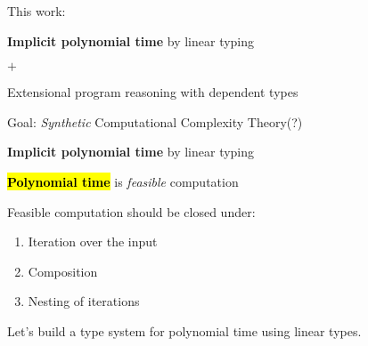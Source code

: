 \documentclass[xetex,aspectratio=169,14pt,hyperref={pdfpagelabels=true,pdflang={en-GB}}]{beamer}
\newcommand{\heading}[1]{\textcolor{TitleRed}{#1}}
\begin{document}
\begin{frame}
  \heading{This work:}

  \bigskip

  \begin{center}
    {\bf Implicit polynomial time} by linear typing

    $+$

    Extensional program reasoning with dependent types
  \end{center}

  \bigskip
  \pause

  \begin{center}
    Goal: {\it Synthetic} Computational Complexity Theory\pause(?)
  \end{center}
\end{frame}

\begin{frame}
  \begin{center}
    {\bf Implicit polynomial time} by linear typing

    \pause

  \end{center}
\end{frame}

\begin{frame}
  \hl{\bf Polynomial time} is \emph{feasible} computation

  \bigskip
  \pause

  Feasible computation should be closed under:
  \begin{enumerate}
  \item<3-> Iteration over the input
  \item<4-> Composition
  \item<5-> Nesting of iterations
  \end{enumerate}

  \pause\pause\pause\pause
  \bigskip

  Let's build a type system for polynomial time using linear types.
\end{frame}

\newcommand{\TyNat}{\textsc{Nat}}
\end{document}
